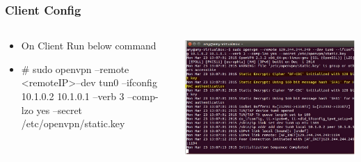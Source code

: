 \documentclass{beamer}
\begin{document}
\begin{frame}
\frametitle{Client Config}
\begin{columns}
    \begin{column}{0.48\textwidth}
        \begin{itemize}
	\item On Client Run below command\\
	\item \# sudo openvpn --remote \textless remoteIP\textgreater  --dev tun0 --ifconfig 10.1.0.2 10.1.0.1 --verb 3 --comp-lzo yes --secret /etc/openvpn/static.key
        \end{itemize}
    \end{column}
    \begin{column}{.5\textwidth}
        \includegraphics[width=.9\linewidth]{am2}
    \end{column}
\end{columns}
\end{frame}
\end{document}
